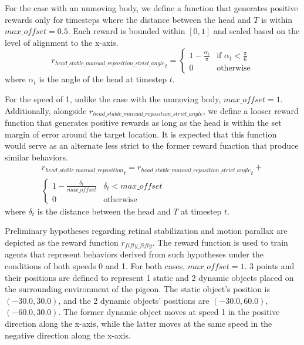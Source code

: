         For the case with an unmoving body, we define a function that generates positive rewards only for timesteps where the distance between the head and $T$ is within $max\_offset = 0.5$. Each reward is bounded within $[0, 1]$ and scaled based on the level of alignment to the x-axis.
          \begin{equation}
              {r_{head\_stable\_manual\_reposition\_strict\_angle}}_t =
              \begin{cases}
                  1 - \frac {\alpha_t} \pi & \text{if $\alpha_t < \frac \pi 6$} \\
                  0 & \text{otherwise}
              \end{cases}
          \end{equation}
        where $\alpha_t$ is the angle of the head at timestep $t$.

        For the speed of 1, unlike the case with the unmoving body, $max\_offset = 1$.
        Additionally, alongside $r_{head\_stable\_manual\_reposition\_strict\_angle}$, we define a looser reward function that generates positive rewards as long as the head is within the set margin of error around the target location.
        It is expected that this function would serve as an alternate less strict to the former reward function that produce similar behaviors.
        \begin{equation}
          \begin{aligned}
            {r_{head\_stable\_manual\_reposition}}_t = {r_{head\_stable\_manual\_reposition\_strict\_angle}}_t + \\
              \begin{cases}
                  1 - \frac {\delta_t} {max\_offset} & \text{$\delta_t < max\_offset$} \\
                  0 & \text{otherwise}
              \end{cases}
          \end{aligned}
        \end{equation}
        where $\delta_t$ is the distance between the head and $T$ at timestep $t$.

    Preliminary hypotheses regarding retinal stabilization and motion parallax are depicted as the reward function $r_{fifty\_fifty}$. The reward function is used to train agents that represent behaviors derived from such hypotheses under the conditions of both speeds 0 and 1. For both cases, $max\_offset = 1$.
      3 points and their positions are defined to represent 1 static and 2 dynamic objects placed on the surrounding environment of the pigeon.
      The static object's position is $(-30.0, 30.0)$, and the 2 dynamic objects' positions are $(-30.0, 60.0)$, $(-60.0, 30.0)$. The former dynamic object moves at speed 1 in the positive direction along the x-axis, while the latter moves at the same speed in the negative direction along the x-axis.

